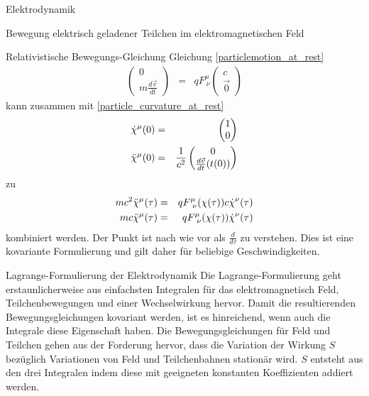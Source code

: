 \begin{chapter}{\titlestr}
\begin{section}{Elektrodynamik}
\begin{subsection}{Bewegung elektrisch geladener Teilchen im elektromagnetischen Feld}
\begin{subsubsection}{Relativistische Bewegungs-Gleichung}
Gleichung \ref{particlemotion_at_rest}
\begin{eqnarray*}
\begin{pmatrix}
0\\
m\frac{d\vec{v}}{dt}
\end{pmatrix} &=& qF^\mu_{\ \nu}\begin{pmatrix}
c\\
\vec{0}
\end{pmatrix}
\end{eqnarray*}
kann zusammen mit \ref{particle_curvature_at_rest}
\begin{eqnarray*}
\dot{\chi}^\mu(0) &=& \begin{pmatrix}
1\\
0
\end{pmatrix}\cr
\ddot{\chi}^\mu(0) &=& 
\frac{1}{c^2}\begin{pmatrix}
0\\
\frac{d\vec{v}}{dt}(t(0))
\end{pmatrix}
\end{eqnarray*}
zu
\begin{eqnarray}
\label{cov_particle_motion}
mc^2\ddot{\chi}^\mu(\tau) &=& qF^\mu_{\ \nu}(\chi(\tau))c\dot{\chi}^\nu(\tau)\cr
mc\ddot{\chi}^\mu(\tau) &=& qF^\mu_{\ \nu}(\chi(\tau))\dot{\chi}^\nu(\tau)
\end{eqnarray}
kombiniert werden. Der Punkt ist nach wie vor als $\frac{d}{d\tau}$ zu verstehen. Dies ist eine kovariante Formulierung und gilt daher für beliebige Geschwindigkeiten.
\end{subsubsection}
\end{subsection}


\begin{subsection}{Lagrange-Formulierung der Elektrodynamik}
Die Lagrange-Formulierung geht erstaunlicherweise aus einfachsten Integralen für das elektromagnetisch Feld, Teilchenbewegungen
und einer Wechselwirkung hervor. Damit die resultierenden Bewegungsgleichungen kovariant werden, ist es hinreichend, wenn auch die Integrale diese Eigenschaft haben. Die Bewegungsgleichungen für Feld und Teilchen gehen aus der Forderung hervor, dass die
Variation der Wirkung $S$ bezüglich Variationen von Feld und Teilchenbahnen stationär wird. $S$ entsteht aus den drei Integralen indem
diese mit geeigneten konstanten Koeffizienten addiert werden.


\end{subsection}
\end{section}
\end{chapter}
